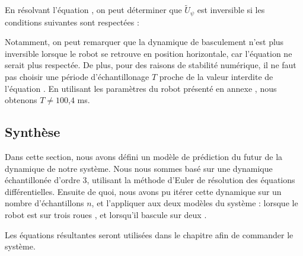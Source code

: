 					En résolvant l'équation , on peut déterminer que $\tilde{U}_\psi$ est inversible si les conditions suivantes sont respectées :
					
					Notamment, on peut remarquer que la dynamique de basculement n'est plus inversible lorsque le robot se retrouve en position horizontale, car l'équation  ne serait plus respectée.
					De plus, pour des raisons de stabilité numérique, il ne faut pas choisir une période d'échantillonage $T$ proche de la valeur interdite de l'équation .
					En utilisant les paramètres du robot présenté en annexe , nous obtenons $T \neq 100$,$4$ ms.
					
		\subsection{Synthèse}
		
			Dans cette section, nous avons défini un modèle de prédiction du futur de la dynamique de notre système. 
			Nous nous sommes basé sur une dynamique échantillonée d'ordre 3, utilisant la méthode d'Euler de résolution des équations différentielles.
			Ensuite de quoi, nous avons pu itérer cette dynamique sur un nombre d'échantillons $n$, et l'appliquer aux deux modèles du système : lorsque le robot est sur trois roues , et lorsqu'il bascule sur deux .  
			
			Les équations résultantes  seront utilisées dans le chapitre  afin de commander le système.